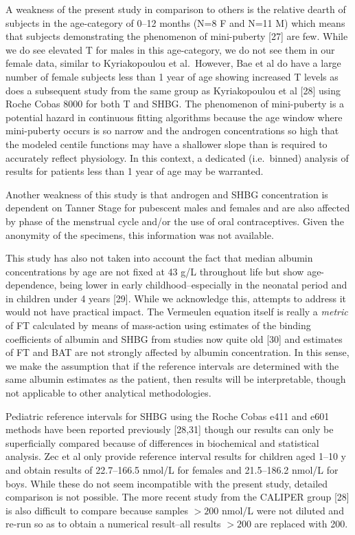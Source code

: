 \documentclass[]{elsarticle} %
\begin{document}
A weakness of the present study in comparison to others is the relative
dearth of subjects in the age-category of 0--12 months (N=8 F and N=11
M) which means that subjects demonstrating the phenomenon of
mini-puberty {[}27{]} are few. While we do see elevated T for males in
this age-category, we do not see them in our female data, similar to
Kyriakopoulou et al.~However, Bae et al do have a large number of female
subjects less than 1 year of age showing increased T levels as does a
subsequent study from the same group as Kyriakopoulou et al {[}28{]}
using Roche Cobas 8000 for both T and SHBG. The phenomenon of
mini-puberty is a potential hazard in continuous fitting algorithms
because the age window where mini-puberty occurs is so narrow and the
androgen concentrations so high that the modeled centile functions may
have a shallower slope than is required to accurately reflect
physiology. In this context, a dedicated (i.e.~binned) analysis of
results for patients less than 1 year of age may be warranted.

Another weakness of this study is that androgen and SHBG concentration
is dependent on Tanner Stage for pubescent males and females and are
also affected by phase of the menstrual cycle and/or the use of oral
contraceptives. Given the anonymity of the specimens, this information
was not available.

This study has also not taken into account the fact that median albumin
concentrations by age are not fixed at 43 g/L throughout life but show
age-dependence, being lower in early childhood--especially in the
neonatal period and in children under 4 years {[}29{]}. While we
acknowledge this, attempts to address it would not have practical
impact. The Vermeulen equation itself is really a \emph{metric} of FT
calculated by means of mass-action using estimates of the binding
coefficients of albumin and SHBG from studies now quite old {[}30{]} and
estimates of FT and BAT are not strongly affected by albumin
concentration. In this sense, we make the assumption that if the
reference intervals are determined with the same albumin estimates as
the patient, then results will be interpretable, though not applicable
to other analytical methodologies.

Pediatric reference intervals for SHBG using the Roche Cobas e411 and
e601 methods have been reported previously {[}28,31{]} though our
results can only be superficially compared because of differences in
biochemical and statistical analysis. Zec et al only provide reference
interval results for children aged 1--10 y and obtain results of
22.7--166.5 nmol/L for females and 21.5--186.2 nmol/L for boys. While
these do not seem incompatible with the present study, detailed
comparison is not possible. The more recent study from the CALIPER group
{[}28{]} is also difficult to compare because samples \(>200\) nmol/L
were not diluted and re-run so as to obtain a numerical result--all
results \(>200\) are replaced with 200.
\end{document}
